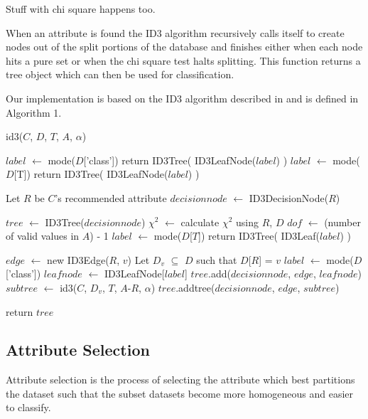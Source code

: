 \documentclass{IEEEtran}
\begin{document}
Stuff with chi square happens too.

When an attribute is found the ID3 algorithm recursively calls itself to
create nodes out of the split portions of the database and finishes
either when each node hits a pure set or when the chi square test
halts splitting. This function returns a tree object which can then be 
used for classification.

Our implementation is based on the ID3 algorithm described
in \parencite{quinlan1986induction} and is defined in Algorithm 1.


\begin{algorithm}
\label{id3algorithm}
\caption{id3($C$, $D$, $T$, $A$, $\alpha$)}
\begin{algorithmic}
  \State $label$ $\leftarrow$ mode($D$['class'])
  \State return ID3Tree( ID3LeafNode($label$) )
\EndIf
{}
  \State $label$ $\leftarrow$ mode($D$[T])
  \State return ID3Tree( ID3LeafNode($label$) )
\EndIf

\State Let $R$ be $C$'s recommended attribute
\State $decisionnode$ $\leftarrow$ ID3DecisionNode($R$)

\State $tree$ $\leftarrow$ ID3Tree($decisionnode$)
  \State $\chi^2$ $\leftarrow$ calculate $\chi^2$ using $R$, $D$
  \State $dof$ $\leftarrow$ (number of valid values in $A$) - 1
    \State $label$ $\leftarrow$ mode($D$[$T$])
    \State return ID3Tree( ID3Leaf($label$) )
  \EndIf

  \State $edge$ $\leftarrow$ new ID3Edge($R$, $v$)
  \State Let $D_v$ $\subseteq$ $D$ such that $D$[$R$] = $v$
    \State $label$ $\leftarrow$ mode($D$['class'])
    \State $leafnode$ $\leftarrow$ ID3LeafNode[$label$]
    \State $tree$.add($decisionnode$, $edge$, $leafnode$)
  \Else
    \State $subtree$ $\leftarrow$ id3($C$, $D_v$, $T$, $A$-$R$, $\alpha$)
    \State $tree$.addtree($decisionnode$, $edge$, $subtree$)
  \EndIf

  return $tree$
\EndFor

\end{algorithmic}
\end{algorithm}


\subsection{Attribute Selection}
Attribute selection is the process of selecting the attribute which
best partitions the dataset such that the subset datasets become more
homogeneous and easier to classify.
\end{document}
